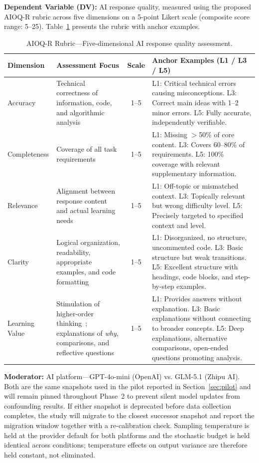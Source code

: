 \documentclass[runningheads]{llncs}
\begin{document}
\textbf{Dependent Variable (DV):} AI response quality, measured using the proposed AIOQ-R rubric across five dimensions on a 5-point Likert scale (composite score range: 5--25). Table~\ref{tab:aioq-r} presents the rubric with anchor examples.

\begin{table}[h]
\caption{AIOQ-R Rubric---Five-dimensional AI response quality assessment.}\label{tab:aioq-r}
\centering
\begin{tabular}{@{}lp{3cm}cp{5cm}@{}}
\toprule
\textbf{Dimension} & \textbf{Assessment Focus} & \textbf{Scale} & \textbf{Anchor Examples (L1 / L3 / L5)} \\
\midrule
Accuracy & Technical correctness of information, code, and algorithmic analysis & 1--5 & L1: Critical technical errors causing misconceptions. L3: Correct main ideas with 1--2 minor errors. L5: Fully accurate, independently verifiable. \\
\addlinespace
Completeness & Coverage of all task requirements & 1--5 & L1: Missing $>$50\% of core content. L3: Covers 60--80\% of requirements. L5: 100\% coverage with relevant supplementary information. \\
\addlinespace
Relevance & Alignment between response content and actual learning needs & 1--5 & L1: Off-topic or mismatched context. L3: Topically relevant but wrong difficulty level. L5: Precisely targeted to specified context and level. \\
\addlinespace
Clarity & Logical organization, readability, appropriate examples, and code formatting & 1--5 & L1: Disorganized, no structure, uncommented code. L3: Basic structure but weak transitions. L5: Excellent structure with headings, code blocks, and step-by-step examples. \\
\addlinespace
Learning Value & Stimulation of higher-order thinking~\cite{Anderson2001}; explanations of \emph{why}, comparisons, and reflective questions & 1--5 & L1: Provides answers without explanation. L3: Basic explanations without connecting to broader concepts. L5: Deep explanations, alternative comparisons, open-ended questions promoting analysis. \\
\bottomrule
\end{tabular}
\end{table}

\textbf{Moderator:} AI platform---GPT-4o-mini (OpenAI) vs. GLM-5.1 (Zhipu AI). Both are the same snapshots used in the pilot reported in Section~\ref{sec:pilot} and will remain pinned throughout Phase~2 to prevent silent model updates from confounding results. If either snapshot is deprecated before data collection completes, the study will migrate to the closest successor snapshot and report the migration window together with a re-calibration check. Sampling temperature is held at the provider default for both platforms and the stochastic budget is held identical across conditions; temperature effects on output variance are therefore held constant, not eliminated.
\end{document}
